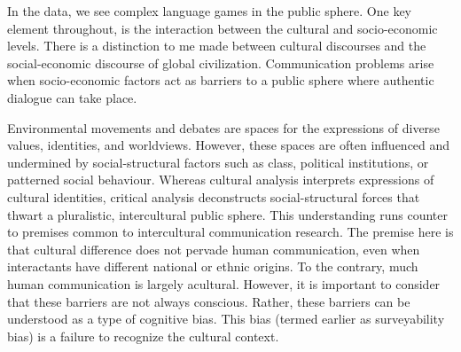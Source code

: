 In the data, we see complex language games in the public sphere. One key element throughout, is the interaction between the cultural and socio-economic levels. There is a distinction to me made between cultural discourses and the social-economic discourse of global civilization. Communication problems arise when socio-economic factors act as barriers to a public sphere where authentic dialogue can take place. 

Environmental movements and debates are spaces for the expressions of diverse values, identities, and worldviews. However, these spaces are often influenced and undermined by social-structural factors such as class, political institutions, or patterned social behaviour. Whereas cultural analysis interprets expressions of cultural identities, critical analysis deconstructs social-structural forces that thwart a pluralistic, intercultural public sphere. This understanding runs counter to premises common to intercultural communication research. The premise here is that cultural difference does not pervade human communication, even when interactants have different national or ethnic origins. To the contrary, much human communication is largely acultural. However, it is important to consider that these barriers are not always conscious. Rather, these barriers can be understood as a type of cognitive bias. This bias (termed earlier as surveyability bias) is a failure to recognize the cultural context.